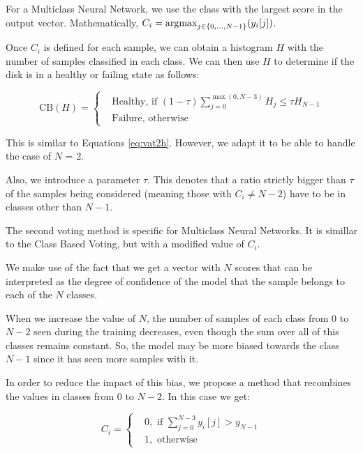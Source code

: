 For a Multiclass Neural Network, we use the class with the largest score in the output vector.
Mathematically, $C_i = \operatorname*{argmax}_{j\in\{0,\dots,N-1\}}(y_i[j])$.

Once $C_i$ is defined for each sample, we can obtain a histogram $H$ with the number of samples classified in each class.
We can then use $H$ to determine if the disk is in a healthy or failing state as follows:

\begin{equation}\label{eq:class_based_voting}
    \text{CB}(H) = 
    \begin{cases}
        &\text{Healthy, if } (1-\tau)\sum_{j=0}^{\max(0,N-3)}H_j \leq \tau H_{N-1} \\
        & \text{Failure, otherwise} 
  \end{cases}
\end{equation}

This is similar to Equations \ref{eq:vat2h}.
However, we adapt it to be able to handle the case of $N$ = 2.

Also, we introduce a parameter $\tau$.
This denotes that a ratio strictly bigger than $\tau$ of the samples being considered (meaning those with $C_i \neq N-2$) have to be in classes other than $N-1$.

The second voting method is specific for Multiclass Neural Networks.
It is simillar to the Class Based Voting, but with a modified value of $C_i$.

We make use of the fact that we get a vector with $N$ scores that can be interpreted as the degree of confidence of the model that the sample belongs to each of the $N$ classes.

When we increase the value of $N$, the number of samples of each class from $0$ to $N-2$ seen during the training decreases, even though the sum over all of this classes remains constant.
So, the model may be more biased towards the class $N-1$ since it has seen more samples with it.

In order to reduce the impact of this bias, we propose a method that recombines the values in classes from $0$ to $N-2$.
In this case we get:

\begin{equation}\label{eq:modified_class}
  C_i = 
  \begin{cases}
    & 0, \text{ if } \sum_{j=0}^{N-3} y_i[j] > y_{N-1} \\
    & 1, \text{ otherwise}
  \end{cases}
\end{equation}

